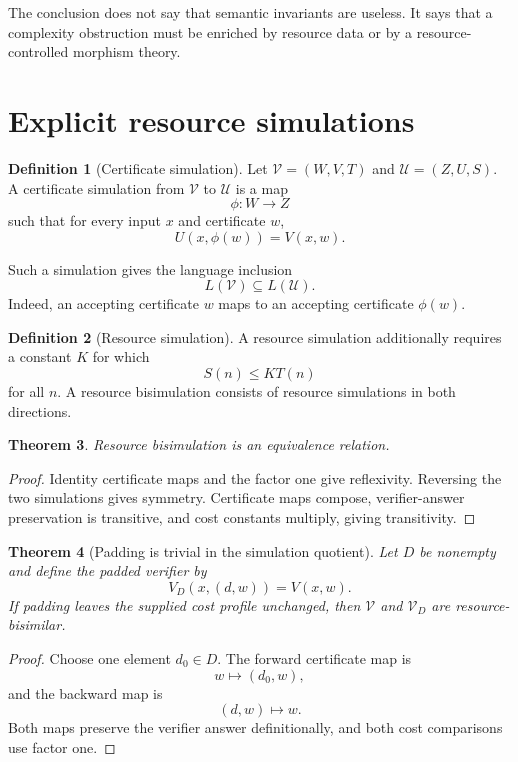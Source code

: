 \documentclass[11pt]{article}
\newtheorem{theorem}{Theorem}[section]
\theoremstyle{definition}
\newtheorem{definition}[theorem]{Definition}
\begin{document}
The conclusion does not say that semantic invariants are useless.  It says
that a complexity obstruction must be enriched by resource data or by a
resource-controlled morphism theory.

\section{Explicit resource simulations}

\begin{definition}[Certificate simulation]
Let \(\mathcal V=(W,V,T)\) and \(\mathcal U=(Z,U,S)\).  A certificate
simulation from \(\mathcal V\) to \(\mathcal U\) is a map
\[
  \phi:W\to Z
\]
such that for every input \(x\) and certificate \(w\),
\[
  U(x,\phi(w))=V(x,w).
\]
\end{definition}

Such a simulation gives the language inclusion
\[
  L(\mathcal V)\subseteq L(\mathcal U).
\]
Indeed, an accepting certificate \(w\) maps to an accepting certificate
\(\phi(w)\).

\begin{definition}[Resource simulation]
A resource simulation additionally requires a constant \(K\) for which
\[
  S(n)\le K T(n)
\]
for all \(n\).  A resource bisimulation consists of resource simulations in
both directions.
\end{definition}

\begin{theorem}
Resource bisimulation is an equivalence relation.
\end{theorem}

\begin{proof}
Identity certificate maps and the factor one give reflexivity.  Reversing the
two simulations gives symmetry.  Certificate maps compose, verifier-answer
preservation is transitive, and cost constants multiply, giving
transitivity.
\end{proof}

\begin{theorem}[Padding is trivial in the simulation quotient]
Let \(D\) be nonempty and define the padded verifier by
\[
  V_D(x,(d,w))=V(x,w).
\]
If padding leaves the supplied cost profile unchanged, then \(\mathcal V\)
and \(\mathcal V_D\) are resource-bisimilar.
\end{theorem}

\begin{proof}
Choose one element \(d_0\in D\).  The forward certificate map is
\[
  w\longmapsto(d_0,w),
\]
and the backward map is
\[
  (d,w)\longmapsto w.
\]
Both maps preserve the verifier answer definitionally, and both cost
comparisons use factor one.
\end{proof}
\end{document}
